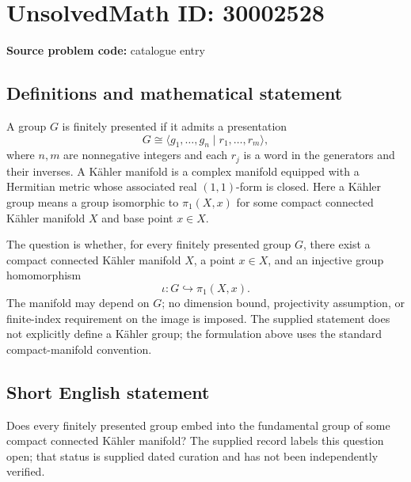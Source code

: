 \documentclass[11pt]{article}
\begin{document}
\section*{UnsolvedMath ID: 30002528}
\textbf{Source problem code:} catalogue entry
\subsection{Definitions and mathematical statement}
A group \(G\) is finitely presented if it admits a presentation
\[
G\cong\langle g_1,\ldots,g_n\mid r_1,\ldots,r_m\rangle,
\]
where \(n,m\) are nonnegative integers and each \(r_j\) is a word in the generators and their inverses. A Kähler manifold is a complex manifold equipped with a Hermitian metric whose associated real \((1,1)\)-form is closed. Here a Kähler group means a group isomorphic to \(\pi_1(X,x)\) for some compact connected Kähler manifold \(X\) and base point \(x\in X\).

The question is whether, for every finitely presented group \(G\), there exist a compact connected Kähler manifold \(X\), a point \(x\in X\), and an injective group homomorphism
\[
\iota:G\hookrightarrow\pi_1(X,x).
\]
The manifold may depend on \(G\); no dimension bound, projectivity assumption, or finite-index requirement on the image is imposed. The supplied statement does not explicitly define a Kähler group; the formulation above uses the standard compact-manifold convention.
\subsection{Short English statement}
Does every finitely presented group embed into the fundamental group of some compact connected Kähler manifold? The supplied record labels this question open; that status is supplied dated curation and has not been independently verified.
\end{document}
